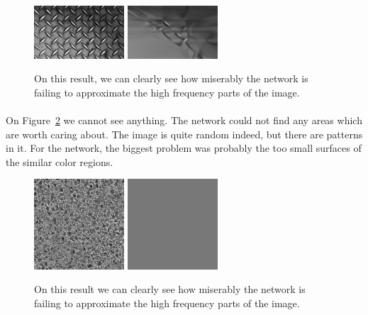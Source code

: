 \documentclass[a4paper]{article}
\begin{document}
\begin{figure}[h]
\centering
\includegraphics[width=0.3\textwidth]{images_old/steel.jpeg}
\includegraphics[width=0.3\textwidth]{images_old/steelo.png}
\caption{\label{fig:steel}On this result, we can clearly see how miserably the network is failing to approximate the high frequency parts of the image.}
\end{figure}

\paragraph{}On Figure~\ref{fig:pebbles} we cannot see anything. The network could not find any areas which are worth caring about. The image is quite random indeed, but there are patterns in it. For the network, the biggest problem was probably the too small surfaces of the similar color regions.

\begin{figure}[h]
\centering
\includegraphics[width=0.3\textwidth]{images_old/pebbles.jpeg}
\includegraphics[width=0.3\textwidth]{images_old/pebbleso.png}
\caption{\label{fig:pebbles}On this result we can clearly see how miserably the network is failing to approximate the high frequency parts of the image.}
\end{figure}
\end{document}
